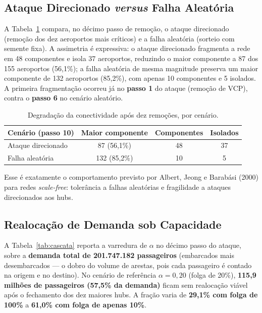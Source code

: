 \documentclass[12pt,a4paper]{article}
\begin{document}
\subsection{Ataque Direcionado \textit{versus} Falha Aleatória}

A Tabela~\ref{tab:ataque} compara, no décimo passo de remoção, o ataque direcionado (remoção dos
dez aeroportos mais críticos) e a falha aleatória (sorteio com semente fixa). A assimetria é
expressiva: o ataque direcionado fragmenta a rede em 48 componentes e isola 37 aeroportos,
reduzindo o maior componente a 87 dos 155 aeroportos (56{,}1\%); a falha aleatória de mesma
magnitude preserva um maior componente de 132 aeroportos (85{,}2\%), com apenas 10 componentes e
5 isolados. A primeira fragmentação ocorreu já no \textbf{passo 1} do ataque (remoção de VCP),
contra o \textbf{passo 6} no cenário aleatório.

\begin{table}[h!]
\centering
\renewcommand{\arraystretch}{1.3}
\small
\begin{tabular}{lccc}
\toprule
\textbf{Cenário (passo 10)} & \textbf{Maior componente} & \textbf{Componentes} & \textbf{Isolados} \\
\midrule
Ataque direcionado & 87 (56{,}1\%) & 48 & 37 \\
Falha aleatória    & 132 (85{,}2\%) & 10 & 5 \\
\bottomrule
\end{tabular}
\caption{Degradação da conectividade após dez remoções, por cenário.}
\label{tab:ataque}
\end{table}

Esse é exatamente o comportamento previsto por Albert, Jeong e Barabási (2000) para redes
\textit{scale-free}: tolerância a falhas aleatórias e fragilidade a ataques direcionados aos
hubs.

\subsection{Realocação de Demanda sob Capacidade}

A Tabela~\ref{tab:cascata} reporta a varredura de $\alpha$ no décimo passo do ataque, sobre a
\textbf{demanda total de 201.747.182 passageiros} (embarcados mais desembarcados --- o dobro do
volume de arestas, pois cada passageiro é contado na origem e no destino). No cenário de
referência $\alpha = 0{,}20$ (folga de 20\%), \textbf{115{,}9 milhões de passageiros (57{,}5\% da
demanda)} ficam sem realocação viável após o fechamento dos dez maiores hubs. A fração varia de
\textbf{29{,}1\% com folga de 100\%} a \textbf{61{,}0\% com folga de apenas 10\%}.
\end{document}
